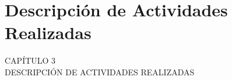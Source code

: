 {
\Hide
\chapter{Descripción de Actividades Realizadas}
}

\begin{titular} 
	\uppercase{
	capítulo 3 \\
	Descripción de Actividades Realizadas \\
	}
\end{titular}



